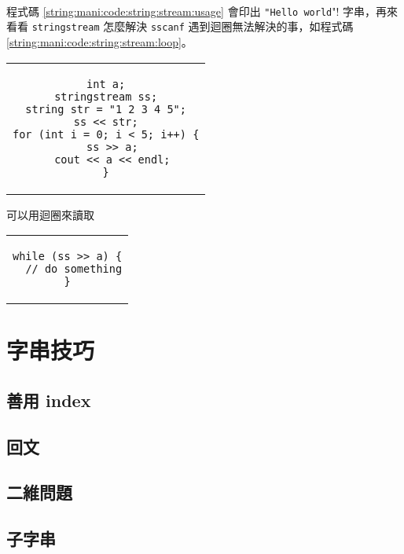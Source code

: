\documentclass[12pt,a4paper,oneside]{report}
\begin{document}
\begin{CJK}{UTF8}{bkai}
\paragraph{}程式碼 \ref{string:mani:code:string:stream:usage} 會印出 \lstinline!"Hello world!"! 字串，再來看看 \lstinline!stringstream! 怎麼解決 \lstinline!sscanf! 遇到迴圈無法解決的事，如程式碼 \ref{string:mani:code:string:stream:loop}。

\begin{code}[h!]
  \centering
  \begin{tabular}{c}
  \begin{lstlisting}
int a;
stringstream ss;
string str = "1 2 3 4 5";
ss << str;
for (int i = 0; i < 5; i++) {
  ss >> a;
  cout << a << endl;
}
  \end{lstlisting}
  \end{tabular}
  \caption{可以用迴圈來讀取}
  \label{string:mani:code:string:stream:loop}
\end{code}

\begin{code}[h!]
  \centering
  \begin{tabular}{c}
  \begin{lstlisting}
while (ss >> a) {
  // do something
}
  \end{lstlisting}
  \end{tabular}
  \caption{\lstinline!stringstream! 碰到 EOF}
  \label{string:mani:code:string:stream:eof}
\end{code}

\section{字串技巧}

\subsection{善用 index}

\subsection{回文}

\subsection{二維問題}

\subsection{子字串}


\end{CJK}
\end{document}
